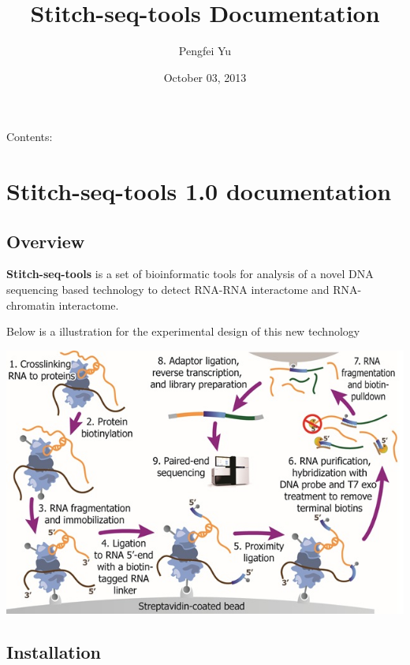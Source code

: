 \documentclass[letterpaper,10pt,english]{sphinxmanual}
\title{Stitch-seq-tools Documentation}
\date{October 03, 2013}
\author{Pengfei Yu}
\begin{document}
\maketitle
\tableofcontents
{}\label{index::doc}


Contents:


\chapter{Stitch-seq-tools 1.0 documentation}
\label{Stitch-seq-tools:stitch-seq-tools-version-documentation}\label{Stitch-seq-tools::doc}\label{Stitch-seq-tools:welcome-to-stitch-seq-tools-s-documentation}

\section{Overview}
\label{Stitch-seq-tools:overview}
\textbf{Stitch-seq-tools} is a set of bioinformatic tools for analysis of a novel DNA sequencing based technology to detect RNA-RNA interactome and RNA-chromatin interactome.

Below is a illustration for the experimental design of this new technology

\includegraphics{exp.jpg}


\section{Installation}
\label{Stitch-seq-tools:installation}
\end{document}
